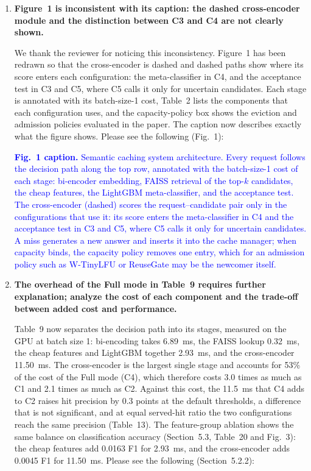 \documentclass[11pt]{article}
\begin{document}
\begin{enumerate}[leftmargin=*, itemsep=1.2em]
\item \textbf{Figure~1 is inconsistent with its caption: the dashed cross-encoder module and the distinction between C3 and C4 are not clearly shown.}

We thank the reviewer for noticing this inconsistency. Figure~1 has been redrawn so that the cross-encoder is dashed and dashed paths show where its score enters each configuration: the meta-classifier in C4, and the acceptance test in C3 and C5, where C5 calls it only for uncertain candidates. Each stage is annotated with its batch-size-1 cost, Table~2 lists the components that each configuration uses, and the capacity-policy box shows the eviction and admission policies evaluated in the paper. The caption now describes exactly what the figure shows. Please see the following (Fig.~1):

\textcolor{blue}{\textbf{Fig.~1 caption.} Semantic caching system architecture. Every request follows the decision path along the top row, annotated with the batch-size-1 cost of each stage: bi-encoder embedding, FAISS retrieval of the top-$k$ candidates, the cheap features, the LightGBM meta-classifier, and the acceptance test. The cross-encoder (dashed) scores the request--candidate pair only in the configurations that use it: its score enters the meta-classifier in C4 and the acceptance test in C3 and C5, where C5 calls it only for uncertain candidates. A miss generates a new answer and inserts it into the cache manager; when capacity binds, the capacity policy removes one entry, which for an admission policy such as W-TinyLFU or ReuseGate may be the newcomer itself.}

\item \textbf{The overhead of the Full mode in Table~9 requires further explanation; analyze the cost of each component and the trade-off between added cost and performance.}

Table~9 now separates the decision path into its stages, measured on the GPU at batch size 1: bi-encoding takes 6.89~ms, the FAISS lookup 0.32~ms, the cheap features and LightGBM together 2.93~ms, and the cross-encoder 11.50~ms. The cross-encoder is the largest single stage and accounts for 53\% of the cost of the Full mode (C4), which therefore costs 3.0 times as much as C1 and 2.1 times as much as C2. Against this cost, the 11.5~ms that C4 adds to C2 raises hit precision by 0.3 points at the default thresholds, a difference that is not significant, and at equal served-hit ratio the two configurations reach the same precision (Table~13). The feature-group ablation shows the same balance on classification accuracy (Section~5.3, Table~20 and Fig.~3): the cheap features add 0.0163 F1 for 2.93~ms, and the cross-encoder adds 0.0045 F1 for 11.50~ms. Please see the following (Section~5.2.2):


\end{enumerate}
\end{document}
